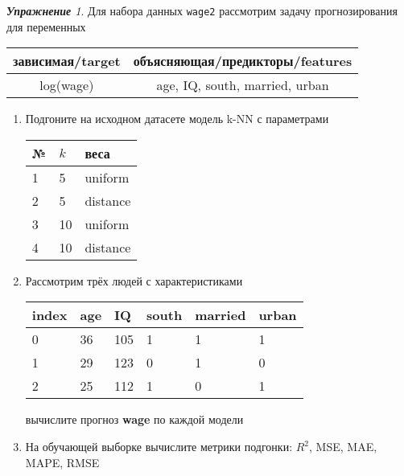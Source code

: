 \documentclass[a4,12pt]{article}
\theoremstyle{remark}
\newtheorem{exercise}{\textbf{Упражнение}}[section]
\begin{document}
\begin{exercise}
Для набора данных \texttt{wage2} рассмотрим задачу прогнозирования
для переменных
\begin{center}
	\begin{tabular}{|c|c|}\hline
		зависимая/target & объясняющая/предикторы/features \\ \hline
		log(wage) & age, IQ, south, married, urban \\ \hline
	\end{tabular}
\end{center}
\begin{enumerate}
	\item Подгоните на исходном датасете модель k-NN с параметрами
	\begin{center}
		\begin{tabular}{|l|l|l|}\hline
		№ & \(k\) & веса \\ \hline
		1 & 5 & uniform \\
		2 & 5 & distance \\
		3 & 10 & uniform \\
		4 & 10 & distance \\ \hline
		\end{tabular}
	\end{center}
	\item Рассмотрим трёх людей с характеристиками
	\begin{center}
		\begin{tabular}{|l||l|l|l|l|l|}\hline
			index & age & IQ & south & married & urban \\ \hline\hline
			0 & 36 & 105 & 1 & 1 & 1 \\
			1 & 29 & 123 & 0 & 1 & 0 \\
			2 & 25 & 112 & 1 & 0 & 1 \\ \hline
		\end{tabular}
	\end{center}
	вычислите прогноз \textbf{wage} по каждой модели

	\item На обучающей выборке вычислите метрики подгонки: \(R^2\), 
	MSE, MAE, MAPE, RMSE
\end{enumerate}
\end{exercise}
\end{document}
